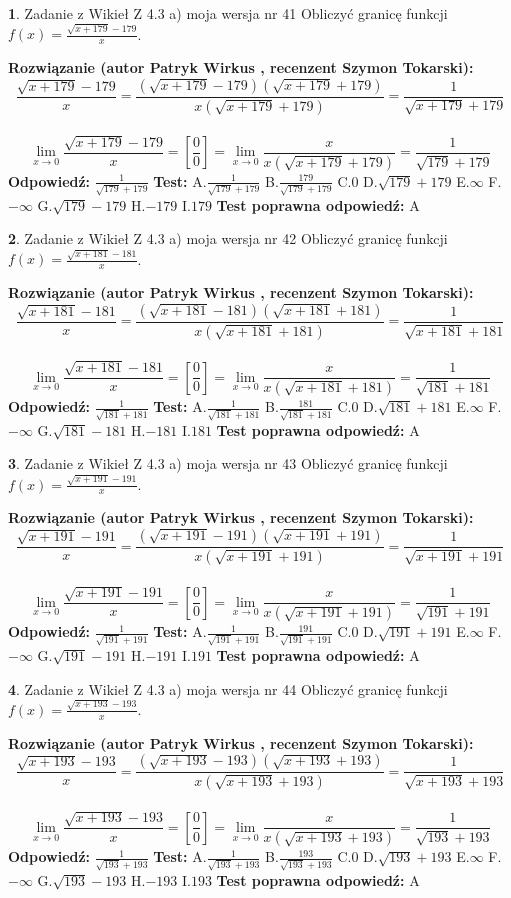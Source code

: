 \documentclass[12pt, a4paper]{article}
\theoremstyle{definition} %
\newtheorem{zad}{}
\newcommand{\zadStart}[1]{\begin{zad}#1\newline}
\newcommand{\zadStop}{\end{zad}}
\newcommand{\rozwStart}[2]{\noindent \textbf{Rozwiązanie (autor #1 , recenzent #2): }\newline}
\newcommand{\rozwStop}{\newline}
\newcommand{\odpStart}{\noindent \textbf{Odpowiedź:}\newline}
\newcommand{\odpStop}{\newline}
\newcommand{\testStart}{\noindent \textbf{Test:}\newline}
\newcommand{\testStop}{\newline}
\newcommand{\kluczStart}{\noindent \textbf{Test poprawna odpowiedź:}\newline}
\newcommand{\kluczStop}{\newline}
\begin{document}
\zadStart{Zadanie z Wikieł Z 4.3 a) moja wersja nr 41}
Obliczyć granicę funkcji $f(x)=\frac{\sqrt{x+179}-179}{x}$.
\zadStop
\rozwStart{Patryk Wirkus}{Szymon Tokarski}
$$\frac{\sqrt{x+179}-179}{x}=\frac{(\sqrt{x+179}-179)(\sqrt{x+179}+179)}{x(\sqrt{x+179}+179)}=\frac{1}{\sqrt{x+179}+179}$$
\\
$$\lim\limits_{x\to0}\frac{\sqrt{x+179}-179}{x}=[\frac{0}{0}]=
\lim\limits_{x\to0}\frac{x}{x(\sqrt{x+179}+179)} = \frac{1}{\sqrt{179}+179}$$
\rozwStop
\odpStart
$\frac{1}{\sqrt{179}+179}$
\odpStop
\testStart
A.$\frac{1}{\sqrt{179}+179}$
B.$\frac{179}{\sqrt{179}+179}$
C.$0$
D.$\sqrt{179}+179$
E.$\infty$
F.$-\infty$
G.$\sqrt{179}-179$
H.$-179$
I.$179$
\testStop
\kluczStart
A
\kluczStop



\zadStart{Zadanie z Wikieł Z 4.3 a) moja wersja nr 42}
Obliczyć granicę funkcji $f(x)=\frac{\sqrt{x+181}-181}{x}$.
\zadStop
\rozwStart{Patryk Wirkus}{Szymon Tokarski}
$$\frac{\sqrt{x+181}-181}{x}=\frac{(\sqrt{x+181}-181)(\sqrt{x+181}+181)}{x(\sqrt{x+181}+181)}=\frac{1}{\sqrt{x+181}+181}$$
\\
$$\lim\limits_{x\to0}\frac{\sqrt{x+181}-181}{x}=[\frac{0}{0}]=
\lim\limits_{x\to0}\frac{x}{x(\sqrt{x+181}+181)} = \frac{1}{\sqrt{181}+181}$$
\rozwStop
\odpStart
$\frac{1}{\sqrt{181}+181}$
\odpStop
\testStart
A.$\frac{1}{\sqrt{181}+181}$
B.$\frac{181}{\sqrt{181}+181}$
C.$0$
D.$\sqrt{181}+181$
E.$\infty$
F.$-\infty$
G.$\sqrt{181}-181$
H.$-181$
I.$181$
\testStop
\kluczStart
A
\kluczStop



\zadStart{Zadanie z Wikieł Z 4.3 a) moja wersja nr 43}
Obliczyć granicę funkcji $f(x)=\frac{\sqrt{x+191}-191}{x}$.
\zadStop
\rozwStart{Patryk Wirkus}{Szymon Tokarski}
$$\frac{\sqrt{x+191}-191}{x}=\frac{(\sqrt{x+191}-191)(\sqrt{x+191}+191)}{x(\sqrt{x+191}+191)}=\frac{1}{\sqrt{x+191}+191}$$
\\
$$\lim\limits_{x\to0}\frac{\sqrt{x+191}-191}{x}=[\frac{0}{0}]=
\lim\limits_{x\to0}\frac{x}{x(\sqrt{x+191}+191)} = \frac{1}{\sqrt{191}+191}$$
\rozwStop
\odpStart
$\frac{1}{\sqrt{191}+191}$
\odpStop
\testStart
A.$\frac{1}{\sqrt{191}+191}$
B.$\frac{191}{\sqrt{191}+191}$
C.$0$
D.$\sqrt{191}+191$
E.$\infty$
F.$-\infty$
G.$\sqrt{191}-191$
H.$-191$
I.$191$
\testStop
\kluczStart
A
\kluczStop



\zadStart{Zadanie z Wikieł Z 4.3 a) moja wersja nr 44}
Obliczyć granicę funkcji $f(x)=\frac{\sqrt{x+193}-193}{x}$.
\zadStop
\rozwStart{Patryk Wirkus}{Szymon Tokarski}
$$\frac{\sqrt{x+193}-193}{x}=\frac{(\sqrt{x+193}-193)(\sqrt{x+193}+193)}{x(\sqrt{x+193}+193)}=\frac{1}{\sqrt{x+193}+193}$$
\\
$$\lim\limits_{x\to0}\frac{\sqrt{x+193}-193}{x}=[\frac{0}{0}]=
\lim\limits_{x\to0}\frac{x}{x(\sqrt{x+193}+193)} = \frac{1}{\sqrt{193}+193}$$
\rozwStop
\odpStart
$\frac{1}{\sqrt{193}+193}$
\odpStop
\testStart
A.$\frac{1}{\sqrt{193}+193}$
B.$\frac{193}{\sqrt{193}+193}$
C.$0$
D.$\sqrt{193}+193$
E.$\infty$
F.$-\infty$
G.$\sqrt{193}-193$
H.$-193$
I.$193$
\testStop
\kluczStart
A
\kluczStop
\end{document}
